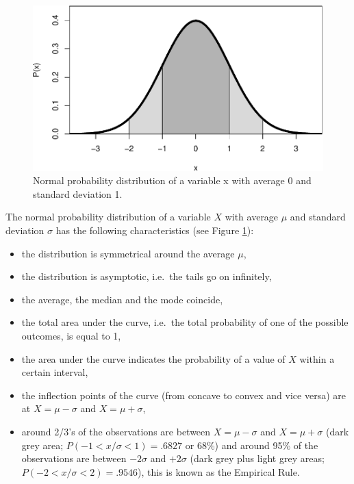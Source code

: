 \documentclass[
]{book}
\begin{document}
\begin{figure}
\centering
\includegraphics{QMS-EN_files/figure-latex/normalprobabilitydistribution-1.pdf}
\caption{\label{fig:normalprobabilitydistribution}Normal probability distribution of a variable x with average 0 and standard deviation 1.}
\end{figure}

The normal probability distribution of a variable \(X\) with average \(\mu\) and
standard deviation \(\sigma\) has the following characteristics (see
Figure \ref{fig:normalprobabilitydistribution}):

\begin{itemize}
\item
  the distribution is symmetrical around the average \(\mu\),
\item
  the distribution is asymptotic, i.e.~the tails go on infinitely,
\item
  the average, the median and the mode coincide,
\item
  the total area under the curve, i.e.~the total probability of one of
  the possible outcomes, is equal to 1,
\item
  the area under the curve indicates the probability of a value of \(X\) within a
  certain interval,
\item
  the inflection points of the curve (from concave to convex and vice versa) are
  at \(X=\mu-\sigma\) and \(X=\mu+\sigma\),
\item
  around 2/3's of the observations are
  between \(X=\mu-\sigma\) and \(X=\mu+\sigma\) (dark grey area;
  \(P(-1<x/\sigma<1)=.6827\) or 68\%) and around 95\% of the observations are
  between \(-2\sigma\) and \(+2\sigma\) (dark grey plus light grey
  areas; \(P(-2<x/\sigma<2)=.9546\)), this is known as the
  Empirical Rule.
\end{itemize}
\end{document}
